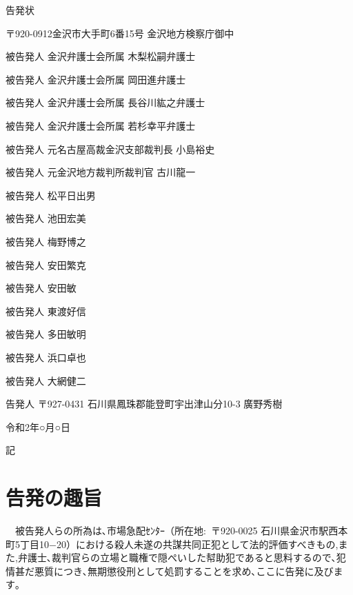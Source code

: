 \documentclass[
]{ltjarticle}
\begin{document}
\fontsize{16pt}{0cm}\selectfont
\begin{center}
告発状
\par\end{center}
\vspace{15mm}

\fontsize{9pt}{9pt}\selectfont
〒920-0912金沢市大手町6番15号 金沢地方検察庁御中 

\fontsize{7pt}{7pt}\selectfont

\hspace{110mm}被告発人 金沢弁護士会所属 木梨松嗣弁護士


\hspace{110mm}被告発人 金沢弁護士会所属 岡田進弁護士


\hspace{110mm}被告発人 金沢弁護士会所属 長谷川紘之弁護士 


\hspace{110mm}被告発人 金沢弁護士会所属 若杉幸平弁護士


\hspace{110mm}被告発人 元名古屋高裁金沢支部裁判長 小島裕史 


\hspace{110mm}被告発人 元金沢地方裁判所裁判官 古川龍一


\hspace{110mm}被告発人 松平日出男


\hspace{110mm}被告発人 池田宏美 


\hspace{110mm}被告発人 梅野博之


\hspace{110mm}被告発人 安田繁克 


\hspace{110mm}被告発人 安田敏 


\hspace{110mm}被告発人 東渡好信 


\hspace{110mm}被告発人 多田敏明 


\hspace{110mm}被告発人 浜口卓也 


\hspace{110mm}被告発人 大網健二


\hspace{110mm}



告発人 〒927-0431 石川県鳳珠郡能登町宇出津山分10-3 廣野秀樹

令和2年○月○日

\fontsize{9pt}{9pt}\selectfont

\vspace{20mm}
\begin{center}
記
\par\end{center}
\vspace{20mm}

\section{告発の趣旨}

　被告発人らの所為は､市場急配ｾﾝﾀｰ（所在地: 〒920-0025 石川県金沢市駅西本町5丁目10−20）における殺人未遂の共謀共同正犯として法的評価すべきもの,また,弁護士､裁判官らの立場と職権で隠ぺいした幇助犯であると思料するので､犯情甚だ悪質につき､無期懲役刑として処罰することを求め､ここに告発に及びます｡
\end{document}
